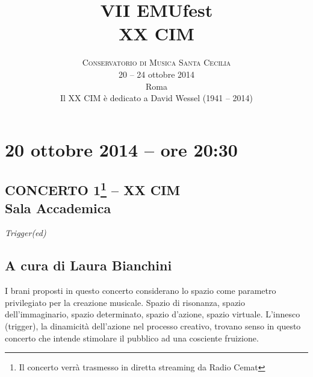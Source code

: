 \documentclass[9pt, twoside, a5paper]{extreport}
\title{\vspace{-15mm}\fontsize{50}{50}\selectfont\textbf{VII EMUfest}\\ \selectfont\textbf{XX CIM}} %
\author{
\large
\textsc{Conservatorio di Musica Santa Cecilia}\\[2mm] %
\large 20 -- 24 ottobre 2014 \\ %
\large Roma \\[24\baselineskip]%
\large Il XX CIM è dedicato a David Wessel (1941 -- 2014)
}
\date{}
\begin{document}
\pagestyle{empty}
\maketitle %



\section*{20 ottobre 2014 -- ore 20:30}
\subsection*{{\small CONCERTO 1\footnote{{\normalsize Il concerto verrà trasmesso in diretta streaming da Radio Cemat}} -- XX CIM\\} \textsf{Sala Accademica\\}}

{\fontsize{30}{30}\selectfont \textit{Trigger(ed)}}

\subsection*{\textsf{A cura di Laura Bianchini}}

{\fontsize{8}{8}\selectfont I brani proposti in questo concerto considerano lo spazio come parametro privilegiato per la creazione musicale. 
Spazio di risonanza, spazio dell’immaginario, spazio determinato, spazio d’azione, spazio virtuale. 
L’innesco (trigger), la dinamicità dell’azione nel processo creativo, trovano senso in questo concerto che intende stimolare il pubblico ad una cosciente fruizione.}

\bigskip  
\end{document}
